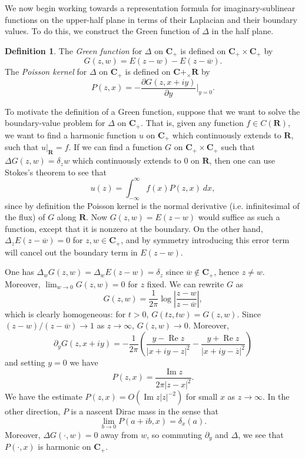 \documentclass[12pt]{report}
\newcommand{\RR}{\mathbf{R}}
\newcommand{\CC}{\mathbf{C}}
\newcommand{\dfn}[1]{\emph{#1}\index{#1}}
\renewcommand{\Re}{\operatorname{Re}}
\renewcommand{\Im}{\operatorname{Im}}
\theoremstyle{definition}
\newtheorem{definition}[theorem]{Definition}
\begin{document}
We now begin working towards a representation formula for imaginary-sublinear functions on the upper-half plane in terms of their Laplacian and their boundary values. To do this, we construct the Green function of $\Delta$ in the half plane.
\begin{definition}
    The \dfn{Green function} for $\Delta$ on $\CC_+$ is defined on $\CC_+ \times \CC_+$ by
$$G(z, w) = E(z - w) - E(z - \overline w).$$
    The \dfn{Poisson kernel} for $\Delta$ on $\CC_+$ is defined on $\CC+_ \times \RR$ by
$$P(z, x) = -\frac{\partial G(z, x + iy)}{\partial y}|_{y = 0}.$$
\end{definition}
  To motivate the definition of a Green function, suppose that we want to solve the boundary-value problem for $\Delta$ on $\CC_+$. That is, given any function $f \in C(\RR)$, we want to find a harmonic function $u$ on $\CC_+$ which continuously extends to $\RR$, such that $u|_\RR = f$. If we can find a function $G$ on $\CC_+ \times \CC_+$ such that $\Delta G(z, w) = \delta_z w$ which continuously extends to $0$ on $\RR$, then one can use Stokes's theorem to see that
$$u(z) = \int_{-\infty}^\infty f(x) P(z, x) ~dx,$$
  since by definition the Poisson kernel is the normal derivative (i.e. infinitesimal of the flux) of $G$ along $\RR$. Now $G(z, w) = E(z - w)$ would suffice as such a function, except that it is nonzero at the boundary. On the other hand, $\Delta_z E(z - \overline w) = 0$ for $z, w \in \CC_+$, and by symmetry introducing this error term will cancel out the boundary term in $E(z - w)$.

    One has $\Delta_w G(z, w) = \Delta_w E(z - w) = \delta_z$ since $\overline w \notin \CC_+$, hence $z \neq w$. Moreover, $\lim_{w \to 0} G(z, w) = 0$ for $z$ fixed. We can rewrite $G$ as
$$G(z, w) = \frac{1}{2\pi} \log\left|\frac{z - w}{z - \overline w}\right|,$$
    which is clearly homogeneous: for $t > 0$, $G(tz, tw) = G(z, w)$. Since $(z-w)/(z - \overline w) \to 1$ as $z \to \infty$, $G(z, w) \to 0$.  Moreover,
$$\partial_y G(z, x + iy) = -\frac{1}{2\pi} \left(\frac{y - \Re z}{|x + iy - z|^2} - \frac{y + \Re z}{|x + iy - \overline z|^2}\right)$$
  and setting $y = 0$ we have
$$P(z, x) = \frac{\Im z}{2\pi|z-x|^2}.$$
We have the estimate $P(z, x) = O(\Im z|z|^{-2})$ for small $x$ as $z \to \infty$. In the other direction, $P$ is a nascent Dirac mass in the sense that
$$\lim_{b \to 0} P(a + ib, x) = \delta_x(a).$$ Moreover, $\Delta G(\cdot, w) = 0$ away from $w$, so commuting $\partial_y$ and $\Delta$, we see that $P(\cdot, x)$ is harmonic on $\CC_+$.
\end{document}
